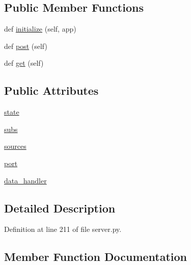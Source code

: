 \subsection*{Public Member Functions}
\begin{DoxyCompactItemize}
\item 
def \hyperlink{classserver_1_1RunListHandler_a91115365c990c3153e1d8ea83303f21f}{initialize} (self, app)
\item 
def \hyperlink{classserver_1_1RunListHandler_aeb0b280967eb942a9c24fc5a928c85e5}{post} (self)
\item 
def \hyperlink{classserver_1_1RunListHandler_a1d58f9257d63a959cd70d67aa7422747}{get} (self)
\end{DoxyCompactItemize}
\subsection*{Public Attributes}
\begin{DoxyCompactItemize}
\item 
\hyperlink{classserver_1_1RunListHandler_ae88e56eec799ca7da0bd28968b0c6c7f}{state}
\item 
\hyperlink{classserver_1_1RunListHandler_a72cf46887c9c9dc3df88b5099019770d}{subs}
\item 
\hyperlink{classserver_1_1RunListHandler_a1fd6a634a94ebd756caa29fb8c178d56}{sources}
\item 
\hyperlink{classserver_1_1RunListHandler_a8df1f2fe4609152e8c1deacf293ea058}{port}
\item 
\hyperlink{classserver_1_1RunListHandler_a36f77e1d95ecc46072ab0999d8558efa}{data\+\_\+handler}
\end{DoxyCompactItemize}


\subsection{Detailed Description}


Definition at line 211 of file server.\+py.



\subsection{Member Function Documentation}
\mbox{\label{classserver_1_1RunListHandler_a1d58f9257d63a959cd70d67aa7422747}} 
